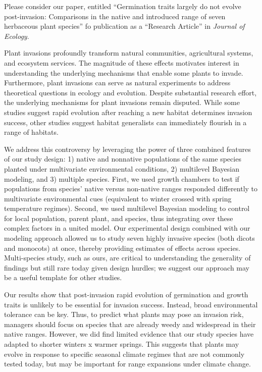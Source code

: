 \documentclass[11pt]{article}
\begin{document}
	\medskip
	Please consider our paper, entitled “Germination traits largely do not evolve post-invasion: Comparisons in the native and introduced range of seven herbaceous plant species” fo publication as a “Research Article” in \textit{Journal of Ecology}. \par
	Plant invasions profoundly transform natural communities, agricultural systems, and ecosystem services. The magnitude of these effects motivates interest in understanding the underlying mechanisms that enable some plants to invade. Furthermore, plant invasions can serve as natural experiments to address theoretical questions in ecology and evolution.  Despite substantial research effort, the underlying mechanisms for plant invasions remain disputed. While some studies suggest rapid evolution after reaching a new habitat determines invasion success, other studies suggest habitat generalists can immediately flourish in a range of habitats.\par 
	We address this controversy by leveraging the power of three combined features of our study design: 1) native and nonnative populations of the same species planted under multivariate environmental conditions, 2) multilevel Bayesian modeling, and 3) multiple species. First, we used growth chambers to test if populations from species' native versus non-native ranges responded differently to multivariate environmental cues (equivalent to winter crossed with spring temperature regimes). Second, we used multilevel Bayesian modeling to control for local population, parent plant, and species, thus integrating over these complex factors in a united model. Our experimental design combined with our modeling approach allowed us to study seven highly invasive species (both dicots and monocots) at once, thereby providing estimates of effects across species. Multi-species study, such as ours, are critical to understanding the generality of findings but still rare today given design hurdles; we suggest our approach may be a useful template for other studies.  \par %
	Our results show that post-invasion rapid evolution of germination and growth traits is unlikely to be essential for invasion success. Instead, broad environmental tolerance can be key. Thus, to predict what plants may pose an invasion risk, managers should focus on species that are already weedy and widespread in their native ranges. However, we did find limited evidence that our study species have adapted to shorter winters x warmer springs. This suggests that plants may evolve in response to specific seasonal climate regimes that are not commonly tested today, but may be important for range expansions under climate change. 
\end{document}

